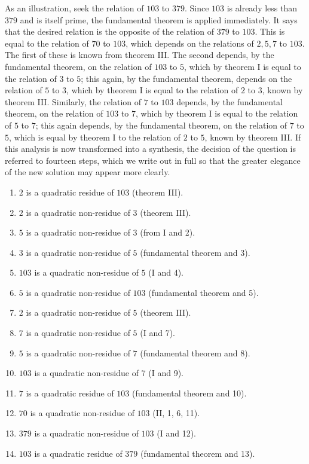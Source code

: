 \documentclass[12pt]{article}
\begin{document}
As an illustration, seek the relation of $103$ to $379$. Since $103$ is already less than $379$ and is itself prime, the fundamental theorem is applied immediately. It says that the desired relation is the opposite of the relation of $379$ to $103$. This is equal to the relation of $70$ to $103$, which depends on the relations of $2,5,7$ to $103$. The first of these is known from theorem III. The second depends, by the fundamental theorem, on the relation of $103$ to $5$, which by theorem I is equal to the relation of $3$ to $5$; this again, by the fundamental theorem, depends on the relation of $5$ to $3$, which by theorem I is equal to the relation of $2$ to $3$, known by theorem III. Similarly, the relation of $7$ to $103$ depends, by the fundamental theorem, on the relation of $103$ to $7$, which by theorem I is equal to the relation of $5$ to $7$; this again depends, by the fundamental theorem, on the relation of $7$ to $5$, which is equal by theorem I to the relation of $2$ to $5$, known by theorem III. If this analysis is now transformed into a synthesis, the decision of the question is referred to fourteen steps, which we write out in full so that the greater elegance of the new solution may appear more clearly.

\begin{enumerate}
\item $2$ is a quadratic residue of $103$ (theorem III).
\item $2$ is a quadratic non-residue of $3$ (theorem III).
\item $5$ is a quadratic non-residue of $3$ (from I and 2).
\item $3$ is a quadratic non-residue of $5$ (fundamental theorem and 3).
\item $103$ is a quadratic non-residue of $5$ (I and 4).
\item $5$ is a quadratic non-residue of $103$ (fundamental theorem and 5).
\item $2$ is a quadratic non-residue of $5$ (theorem III).
\item $7$ is a quadratic non-residue of $5$ (I and 7).
\item $5$ is a quadratic non-residue of $7$ (fundamental theorem and 8).
\item $103$ is a quadratic non-residue of $7$ (I and 9).
\item $7$ is a quadratic residue of $103$ (fundamental theorem and 10).
\item $70$ is a quadratic non-residue of $103$ (II, 1, 6, 11).
\item $379$ is a quadratic non-residue of $103$ (I and 12).
\item $103$ is a quadratic residue of $379$ (fundamental theorem and 13).
\end{enumerate}
\end{document}
